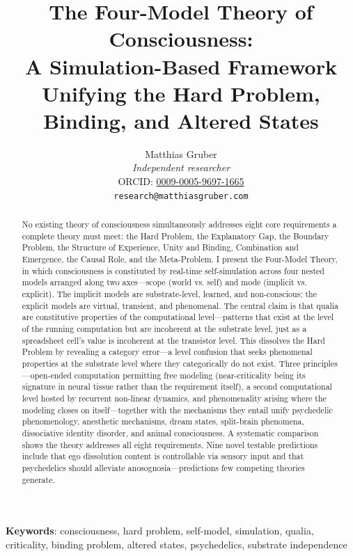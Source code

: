 \documentclass[12pt]{article}
\title{The Four-Model Theory of Consciousness:\\A Simulation-Based Framework Unifying the Hard Problem, Binding, and Altered States}
\author{Matthias Gruber\\
\textit{Independent researcher}\\
ORCID: \href{https://orcid.org/0009-0005-9697-1665}{0009-0005-9697-1665}\\
\texttt{research@matthiasgruber.com}}
\date{}
\begin{document}
\maketitle

\begin{abstract}\singlespacing
No existing theory of consciousness simultaneously addresses eight core requirements a complete theory must meet: the Hard Problem, the Explanatory Gap, the Boundary Problem, the Structure of Experience, Unity and Binding, Combination and Emergence, the Causal Role, and the Meta-Problem. I present the Four-Model Theory, in which consciousness is constituted by real-time self-simulation across four nested models arranged along two axes---\hspace{0pt}scope (world vs. self) and mode (implicit vs. explicit). The implicit models are substrate-level, learned, and non-conscious; the explicit models are virtual, transient, and phenomenal. The central claim is that qualia are constitutive properties of the computational level---\hspace{0pt}patterns that exist at the level of the running computation but are incoherent at the substrate level, just as a spreadsheet cell's value is incoherent at the transistor level. This dissolves the Hard Problem by revealing a category error---\hspace{0pt}a level confusion that seeks phenomenal properties at the substrate level where they categorically do not exist. Three principles---\hspace{0pt}open-ended computation permitting free modeling (near-criticality being its signature in neural tissue rather than the requirement itself), a second computational level hosted by recurrent non-linear dynamics, and phenomenality arising where the modeling closes on itself---\hspace{0pt}together with the mechanisms they entail unify psychedelic phenomenology, anesthetic mechanisms, dream states, split-brain phenomena, dissociative identity disorder, and animal consciousness. A systematic comparison shows the theory addresses all eight requirements. Nine novel testable predictions include that ego dissolution content is controllable via sensory input and that psychedelics should alleviate anosognosia---\hspace{0pt}predictions few competing theories generate.
\end{abstract}

\noindent\textbf{Keywords}: consciousness, hard problem, self-model, simulation, qualia, criticality, binding problem, altered states, psychedelics, substrate independence
\end{document}

